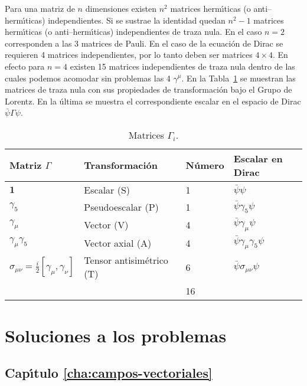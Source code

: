 Para una matriz de $n$ dimensiones existen $n^2$ matrices herm\'\i ticas (o anti--herm\'\i ticas) independientes. Si se sustrae la identidad quedan $n^2-1$ matrices herm\'\i ticas (o anti--herm\'\i ticas) independientes de traza nula. En el caso $n=2$ corresponden a las 3 matrices de Pauli. En el caso de la ecuaci\'on de Dirac se requieren 4 matrices independientes, por lo tanto deben ser matrices $4\times4$. En efecto para $n=4$ existen 15 matrices independientes de traza nula dentro de las cuales podemos acomodar sin problemas las 4 $\gamma^\mu$. En la Tabla~\ref{tab:Gamma} se muestran las matrices de traza nula con sus propiedades de transformaci\'on bajo el Grupo de Lorentz. En la \'ultima se muestra el correspondiente escalar en el espacio de Dirac $\bar\psi\Gamma\psi$.
\begin{table} %
  \centering %
  \begin{tabular}{l|l|l|l} %
Matriz $\Gamma$&Transformaci\'on&N\'umero&Escalar en Dirac\\\hline{}
$\mathbf{1}$&Escalar (S)&1&$\bar\psi\psi$\\
$\gamma_5$&Pseudoescalar (P)&1&$\bar\psi\gamma_5\psi$\\
$\gamma_\mu$&Vector (V)&4&$\bar\psi\gamma_\mu\psi$\\
$\gamma_\mu\gamma_5$ &Vector axial (A)&4&$\bar\psi\gamma_\mu\gamma_5\psi$\\
$\sigma_{\mu\nu}=\frac{i}{2}\left[\gamma_\mu,\gamma_\nu\right]$&Tensor antisim\'etrico (T)&6&$\bar\psi\sigma_{\mu\nu}\psi$\\\hline{}
&&16&\\
  \end{tabular} %
  \caption{Matrices $\Gamma_i$.} %
\label{tab:Gamma} %
\end{table} %




\chapter{Soluciones a los problemas}

\section*{Cap\'\i tulo \ref{cha:campos-vectoriales}}

